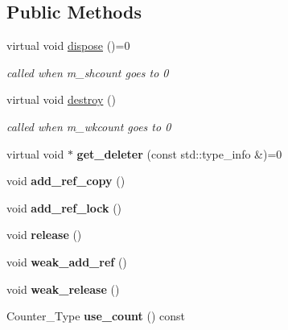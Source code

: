 \subsection*{Public Methods}
\begin{DoxyCompactItemize}
\item 
\mbox{\label{classcugar_1_1internals_1_1_counted_base_a0136f9f7bac652b751f55c3fd3c0b9c0}} 
virtual void \hyperlink{classcugar_1_1internals_1_1_counted_base_a0136f9f7bac652b751f55c3fd3c0b9c0}{dispose} ()=0
\begin{DoxyCompactList}\small\item\em called when m\+\_\+shcount goes to 0 \end{DoxyCompactList}\item 
\mbox{\label{classcugar_1_1internals_1_1_counted_base_a8d50ddc2bea77d1593b35cc5824209af}} 
virtual void \hyperlink{classcugar_1_1internals_1_1_counted_base_a8d50ddc2bea77d1593b35cc5824209af}{destroy} ()
\begin{DoxyCompactList}\small\item\em called when m\+\_\+wkcount goes to 0 \end{DoxyCompactList}\item 
\mbox{\label{classcugar_1_1internals_1_1_counted_base_a2663fb7f1277adc6e78e5ef3837193a9}} 
virtual void $\ast$ {\bfseries get\+\_\+deleter} (const std\+::type\+\_\+info \&)=0
\item 
\mbox{\label{classcugar_1_1internals_1_1_counted_base_ad42bcdc01fd577f3a5a773ab31d87703}} 
void {\bfseries add\+\_\+ref\+\_\+copy} ()
\item 
\mbox{\label{classcugar_1_1internals_1_1_counted_base_a4e1334553d5dd0eb613458934ec1b7dc}} 
void {\bfseries add\+\_\+ref\+\_\+lock} ()
\item 
\mbox{\label{classcugar_1_1internals_1_1_counted_base_a5a7753e0b4f9a4bfa04bdac9deba9551}} 
void {\bfseries release} ()
\item 
\mbox{\label{classcugar_1_1internals_1_1_counted_base_add70ea2da8983c02438c56be9bdb9156}} 
void {\bfseries weak\+\_\+add\+\_\+ref} ()
\item 
\mbox{\label{classcugar_1_1internals_1_1_counted_base_a968071f8e4891a792dd68a185f852359}} 
void {\bfseries weak\+\_\+release} ()
\item 
\mbox{\label{classcugar_1_1internals_1_1_counted_base_a63ccdbc5b6fa3e45e3191429309eb66f}} 
Counter\+\_\+\+Type {\bfseries use\+\_\+count} () const
\end{DoxyCompactItemize}


